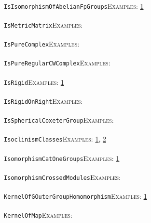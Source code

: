 \documentclass[a4paper,11pt]{report}
\begin{document}
{{ \\
 \texttt{IsIsomorphismOfAbelianFpGroups}{\nobreakspace}{\nobreakspace}{\nobreakspace}{\nobreakspace}\textsc{Examples:} \href{tutorial/chap1.html} {1}{\nobreakspace} \\
 \\
 \texttt{IsMetricMatrix}{\nobreakspace}{\nobreakspace}{\nobreakspace}{\nobreakspace}\textsc{Examples:} \\
 \\
 \texttt{IsPureComplex}{\nobreakspace}{\nobreakspace}{\nobreakspace}{\nobreakspace}\textsc{Examples:} \\
 \\
 \texttt{IsPureRegularCWComplex}{\nobreakspace}{\nobreakspace}{\nobreakspace}{\nobreakspace}\textsc{Examples:} \\
 \\
 \texttt{IsRigid}{\nobreakspace}{\nobreakspace}{\nobreakspace}{\nobreakspace}\textsc{Examples:} \href{tutorial/chap8.html} {1}{\nobreakspace} \\
 \\
 \texttt{IsRigidOnRight}{\nobreakspace}{\nobreakspace}{\nobreakspace}{\nobreakspace}\textsc{Examples:} \\
 \\
 \texttt{IsSphericalCoxeterGroup}{\nobreakspace}{\nobreakspace}{\nobreakspace}{\nobreakspace}\textsc{Examples:} \\
 \\
 \texttt{IsoclinismClasses}{\nobreakspace}{\nobreakspace}{\nobreakspace}{\nobreakspace}\textsc{Examples:} \href{tutorial/chap5.html} {1}{\nobreakspace}, \href{../www/SideLinks/About/aboutBogomolov.html} {2}{\nobreakspace} \\
 \\
 \texttt{IsomorphismCatOneGroups}{\nobreakspace}{\nobreakspace}{\nobreakspace}{\nobreakspace}\textsc{Examples:} \href{../www/SideLinks/About/aboutquasi.html} {1}{\nobreakspace} \\
 \\
 \texttt{IsomorphismCrossedModules}{\nobreakspace}{\nobreakspace}{\nobreakspace}{\nobreakspace}\textsc{Examples:} \\
 \\
 \texttt{KernelOfGOuterGroupHomomorphism}{\nobreakspace}{\nobreakspace}{\nobreakspace}{\nobreakspace}\textsc{Examples:} \href{../www/SideLinks/About/aboutCoefficientSequence.html} {1}{\nobreakspace} \\
 \\
 \texttt{KernelOfMap}{\nobreakspace}{\nobreakspace}{\nobreakspace}{\nobreakspace}\textsc{Examples:} \\
}}
\end{document}
